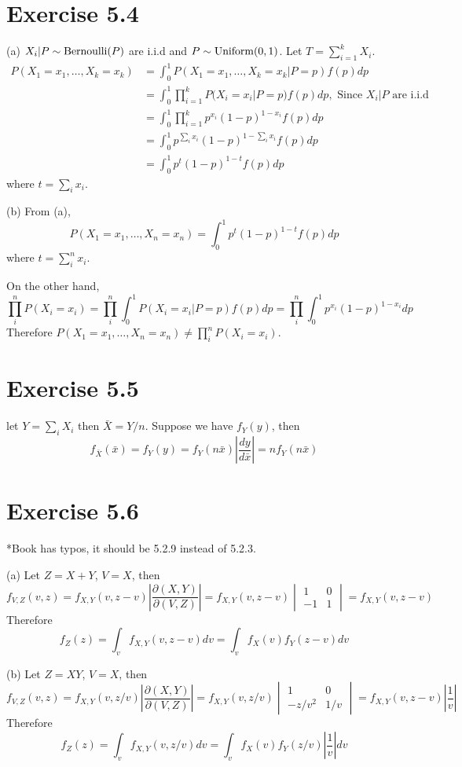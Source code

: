 \documentclass[12pt]{article}
\begin{document}
\section*{Exercise 5.4}
(a) $X_i | P \sim \mathrm{Bernoulli}(P)$ are i.i.d and $P \sim \mathrm{Uniform}(0,1)$. Let $ T = \sum_{i=1}^k X_i$.
$$ \begin{aligned}
	P(X_1=x_1,\ldots, X_k=x_k) &= \int^1_0 P(X_1=x_1,\ldots, X_k=x_k |P=p)f(p)dp \\
	&= \int_0^1 \prod_{i=1}^k P(X_i=x_i |P=p)f(p) dp, \mbox{ Since } X_i|P \mbox{ are i.i.d} \\
	&= \int_0^1 \prod_{i=1}^k p^{x_i}(1-p)^{1-x_i}f(p) dp \\
	&= \int_0^1 p^{\sum_i x_i}(1-p)^{1-\sum_i x_i}f(p) dp \\
	&= \int_0^1 p^t(1-p)^{1-t}f(p) dp
\end{aligned} 
$$ 
where $t = \sum_i x_i$. \QED 

(b) From (a),
  $$ P(X_1=x_1,\ldots, X_n=x_n) = \int_0^1 p^t(1-p)^{1-t}f(p) dp  $$
where $t = \sum_i^n x_i$.

On the other hand,  $$\prod^n_i P(X_i=x_i) = \prod^n_i \int_0^1 P(X_i=x_i | P=p)f(p)dp = \prod^n_i \int_0^1 p^{x_i}(1-p)^{1-x_i}dp $$
Therefore $P(X_1=x_1,\ldots, X_n=x_n) \neq \prod^n_i P(X_i=x_i)$. \QED

\section*{Exercise 5.5}
let $Y = \sum_i X_i$ then $\bar{X} =Y/n$. Suppose we have $f_Y(y)$,  then $$f_{\bar{X}}(\bar{x}) = f_Y(y) = f_Y(n \bar{x}) \left|\frac{dy}{d\bar{x}}\right| = n f_Y(n\bar{x})
$$

\section*{Exercise 5.6}
*Book has typos, it should be 5.2.9 instead of 5.2.3.

(a) Let $Z= X+Y$, $V=X$, then 
  $$ f_{V, Z}(v, z) = f_{X, Y}(v, z-v) \left| \frac{\partial (X, Y)}{\partial(V, Z)}\right| =f_{X, Y}(v, z-v)  \begin{vmatrix}1 & 0 \\ -1 & 1 \end{vmatrix} = f_{X, Y}(v, z-v) $$
Therefore $$f_Z(z) = \int_v f_{X, Y}(v, z-v)dv =\int_v f_{X}(v) f_{Y}(z-v)dv $$

(b) Let $Z= XY$, $V = X$, then
$$ f_{V, Z}(v, z) = f_{X, Y}(v, z/v) \left| \frac{\partial (X, Y)}{\partial(V, Z)}\right| =f_{X, Y}(v, z/v)  \begin{vmatrix}1 & 0 \\ -z/v^2 & 1/v \end{vmatrix} = f_{X, Y}(v, z-v) \left| \frac{1}{v} \right| $$
Therefore $$f_Z(z) = \int_v f_{X, Y}(v, z/v)dv =\int_v f_{X}(v) f_{Y}(z/v)  \left| \frac{1}{v} \right|dv $$
\end{document}
